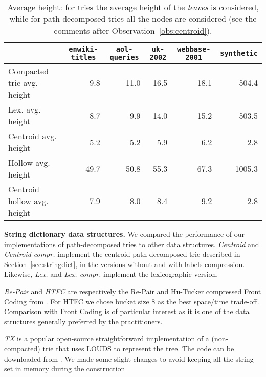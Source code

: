 \documentclass[a4paper,11pt]{article}
\newcommand{\ttlpar}[1]{\noindent\textbf{#1}}
\theoremstyle{nonumberplain}
\begin{document}
\begin{table}[tbp]
  \shrinktable
  \begin{center}
    { 
      \scriptsize
      \setlength{\tabcolsep}{1ex}
      \renewcommand\arraystretch{1} 
\begin{tabular}{lrrrrr}\toprule
&  \multicolumn{1}{c}{\scriptsize\texttt{enwiki-titles}}&\multicolumn{1}{c}{\scriptsize\texttt{aol-queries}}&\multicolumn{1}{c}{\scriptsize\texttt{uk-2002}}&\multicolumn{1}{c}{\scriptsize\texttt{webbase-2001}}&\multicolumn{1}{c}{\scriptsize\texttt{synthetic}} \\
\midrule
Compacted trie avg. height & 9.8 & 11.0 & 16.5 & 18.1 & 504.4 \\
Lex. avg. height & 8.7 & 9.9 & 14.0 & 15.2 & 503.5 \\
Centroid avg. height & 5.2 & 5.2 & 5.9 & 6.2 & 2.8 \\
\midrule
Hollow avg. height & 49.7 & 50.8 & 55.3 & 67.3 & 1005.3 \\
Centroid hollow avg. height & 7.9 & 8.0 & 8.4 & 9.2 & 2.8 \\
\bottomrule
\end{tabular}
    }
  \end{center}
  \caption{Average height: for tries the average height of
    the \emph{leaves} is considered, while for path-decomposed tries
    all the nodes are considered (see the comments after
    Observation~\ref{obs:centroid}).}
  \label{tab:stats}
\end{table}

\ttlpar{String dictionary data structures.} 
We compared the
performance of our implementations of path-decomposed tries to other
data structures. \emph{Centroid} and \emph{Centroid
  compr.} implement the centroid path-decomposed trie described in
Section~\ref{sec:stringdict}, in the versions without and with labels
compression. Likewise, \emph{Lex.} and \emph{Lex. compr.}  implement
the lexicographic version.

\emph{Re-Pair} and \emph{HTFC} are respectively the Re-Pair and
Hu-Tucker compressed Front Coding from
\cite{csd11}. For HTFC we chose bucket size $8$ as the best space/time
trade-off. Comparison with Front Coding is of particular interest as it is
one of the data structures generally preferred by the practitioners.

\emph{TX} is a popular open-source straightforward implementation of a
(non-compacted) trie that uses LOUDS \cite{jacobson89} to represent
the tree. The code can be downloaded
from \cite{tx}. We made some slight changes to avoid keeping all the
string set in memory during the construction
\end{document}
